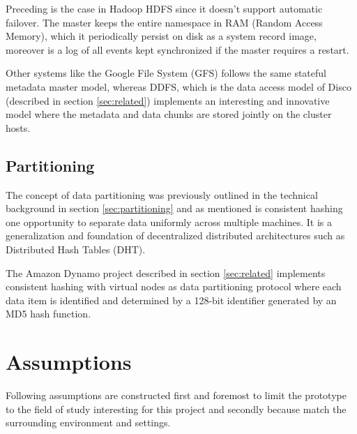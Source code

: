 Preceding is the case in Hadoop HDFS since it doesn't support automatic failover. The master keeps the entire namespace in RAM (Random Access Memory), which it periodically persist on disk as a system record image, moreover is a log of all events kept synchronized if the master requires a restart.
\newline

Other systems like the Google File System (GFS) follows the same stateful metadata master model, whereas DDFS, which is the data access model of Disco (described in section \ref{sec:related}) implements an interesting and innovative model where the metadata and data chunks are stored jointly on the cluster hosts.
\vspace*{3mm}

\subsection*{Partitioning}
The concept of data partitioning was previously outlined in the technical background in section \ref{sec:partitioning} and as mentioned is consistent hashing one opportunity to separate data uniformly across multiple machines. It is a generalization and foundation of decentralized distributed architectures such as Distributed Hash Tables (DHT). 

The Amazon Dynamo project described in section \ref{sec:related} implements consistent hashing with virtual nodes as data partitioning protocol where each data item is identified and determined by a 128-bit identifier generated by an MD5 hash function.

\section{Assumptions} \label{sec:assumptions}
Following assumptions are constructed first and foremost to limit the prototype to the field of study interesting for this project and secondly because match the surrounding environment and settings.

